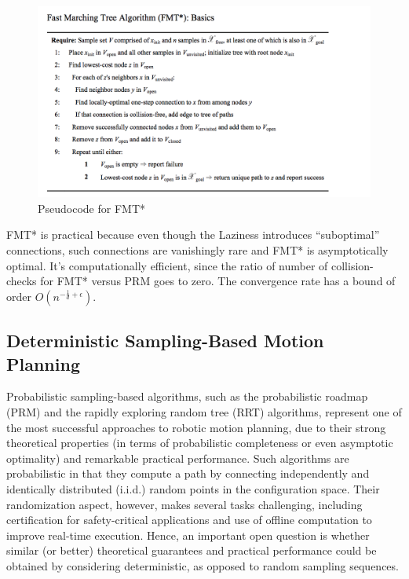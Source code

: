 \documentclass[twoside]{article}
\begin{document}
\begin{figure}[h!]
  \centering
  \includegraphics[width=140mm]{Pseudocode.png}
  \caption{Pseudocode for FMT*}
  \label{fig:plot_Pseudocode}
\end{figure}

FMT* is practical because even though the Laziness introduces “suboptimal” connections, such connections are vanishingly rare and FMT* is asymptotically optimal. It's computationally efficient, since the ratio of number of collision-checks for FMT* versus PRM goes to zero. The convergence rate has a bound of order $O(n^{−\frac{1}{d}+\epsilon})$.


\subsection{Deterministic Sampling-Based Motion Planning}
Probabilistic sampling-based algorithms, such as the probabilistic roadmap (PRM) and the rapidly exploring random tree (RRT) algorithms, represent one of the most successful approaches to robotic motion planning, due to their strong theoretical properties (in terms of probabilistic completeness or even asymptotic optimality) and remarkable practical performance. Such algorithms are probabilistic in that they compute a path by connecting independently and identically distributed (i.i.d.) random points in the configuration space. Their randomization aspect, however, makes several tasks challenging, including certification for safety-critical applications and use of offline computation to improve real-time execution. Hence, an important open question is whether similar (or better) theoretical guarantees and practical performance could be obtained by considering deterministic, as opposed to random sampling sequences.
\end{document}
